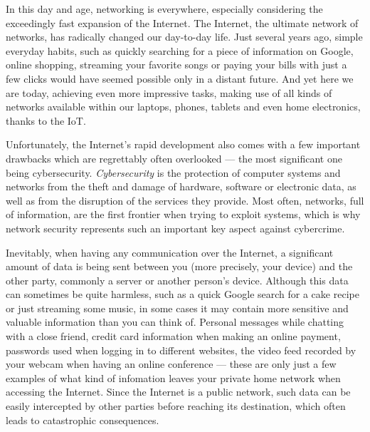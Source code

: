 \documentclass[a4paper,12pt]{report}
\begin{document}
	In this day and age, networking is everywhere, especially considering the exceedingly fast expansion of the Internet. The Internet, the ultimate network of networks, has radically changed our day-to-day life. Just several years ago, simple everyday habits, such as quickly searching for a piece of information on Google, online shopping, streaming your favorite songs or paying your bills with just a few clicks would have seemed possible only in a distant future. And yet here we are today, achieving even more impressive tasks, making use of all kinds of networks available within our laptops, phones, tablets and even home electronics, thanks to the IoT.
		
		Unfortunately, the Internet's rapid development also comes with a few important drawbacks which are regrettably often overlooked --- the most significant one being cybersecurity. \textit{Cybersecurity} is the protection of computer systems and networks from the theft and damage of hardware, software or electronic data, as well as from the disruption of the services they provide. Most often, networks, full of information, are the first frontier when trying to exploit systems,  which is why network security represents such an important key aspect against cybercrime.
		
		Inevitably, when having any communication over the Internet, a significant amount of data is being sent between you (more precisely, your device) and the other party, commonly a server or another person's device. Although this data can sometimes be quite harmless, such as a quick Google search for a cake recipe or just streaming some music, in some cases it may contain more sensitive and valuable information than you can think of. Personal messages while chatting with a close friend, credit card information when making an online payment, passwords used when logging in to different websites, the video feed recorded by your webcam when having an online conference --- these are only just a few examples of what kind of infomation leaves your private home network when accessing the Internet. Since the Internet is a public network, such data can be easily intercepted by other parties before reaching its destination, which often leads to catastrophic consequences.
		
\end{document}
